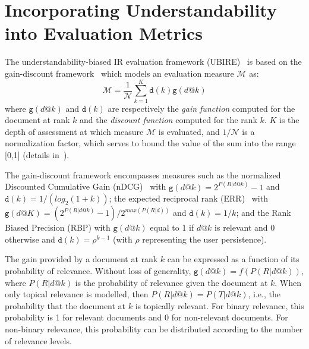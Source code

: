 \section{Incorporating Understandability into Evaluation Metrics}
\label{sec:understandability_metrics}
The understandability-biased IR evaluation framework (UBIRE)~\cite{zuccon14,zuccon16} is based on the gain-discount framework~\cite{carterette11} which models an evaluation measure $\mathcal{M}$ as:
%
\vspace{-4pt}
\begin{equation*}
\mathcal{M} = \frac{1}{\mathcal{N}} \sum_{k=1}^{K} \mathtt{d}(k) \mathtt{g}(d@k)
\end{equation*}
%
where $\mathtt{g}(d@k)$ and $\mathtt{d}(k)$ are respectively the \textit{gain function} computed for the document at rank $k$ and the \textit{discount function} computed for the rank $k$.
$K$ is the depth of assessment at which measure $\mathcal{M}$ is evaluated, and $1/\mathcal{N}$ is a normalization factor, which serves to bound the value of the sum into the range [0,1] (details in~\cite{carterette11}).

The gain-discount framework encompasses measures such as the normalized Discounted Cumulative Gain (nDCG)~\cite{jarvelin02} with $\mathtt{g}(d@k) = 2^{P(R|d@k)} - 1$ and $\mathtt{d}(k) = 1/(log_2(1 + k))$; the expected reciprocal rank (ERR)~\cite{chapelle09} with $\mathtt{g}(d@K) =  (2^{P (R|d@k)} - 1)/2^{max(P (R|d))}$ and $\mathtt{d}(k) = 1/k$; and the Rank Biased Precision (RBP) with $\mathtt{g}(d@k)$ equal to 1 if $d@k$ is relevant and 0 otherwise and $\mathtt{d}(k) = \rho^{k-1}$ (with $\rho$ representing the user persistence).

The gain provided by a document at rank $k$ can be expressed as a function of its probability of relevance. Without loss of generality, $\mathtt{g}(d@k) = f(P(R|d@k))$, where $P(R|d@k)$ is the probability of relevance given the document at $k$. 
When only topical relevance is modelled, then $P(R|d@k) = P(T|d@k)$, i.e., the probability that the document at $k$ is topically relevant. 
For binary relevance, this probability is 1 for relevant documents and 0 for non-relevant documents. For non-binary relevance, this probability can be distributed according to the number of relevance levels.

